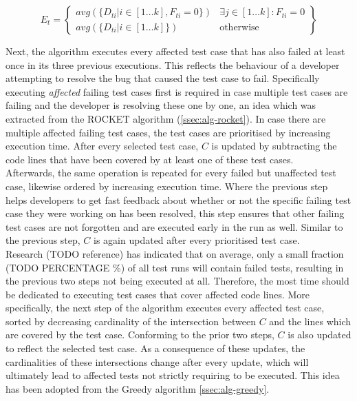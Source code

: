 \[
E_t = \left\{
\begin{array}{rl}
avg(\{D_{ti} \vert i \in [1 \dots k], F_{ti} = 0\}) & \exists j \in [1 \dots k] : F_{ti} = 0 \\
avg(\{D_{ti} \vert i \in [1 \dots k]\}) & \text{otherwise}
\end{array}
\right\}
\]

\noindent Next, the algorithm executes every affected test case that has also failed at least once in its three previous executions. This reflects the behaviour of a developer attempting to resolve the bug that caused the test case to fail. Specifically executing \emph{affected} failing test cases first is required in case multiple test cases are failing and the developer is resolving these one by one, an idea which was extracted from the ROCKET algorithm (\autoref{ssec:alg-rocket}). In case there are multiple affected failing test cases, the test cases are prioritised by increasing execution time. After every selected test case, $C$ is updated by subtracting the code lines that have been covered by at least one of these test cases.\\

\noindent Afterwards, the same operation is repeated for every failed but unaffected test case, likewise ordered by increasing execution time. Where the previous step helps developers to get fast feedback about whether or not the specific failing test case they were working on has been resolved, this step ensures that other failing test cases are not forgotten and are executed early in the run as well. Similar to the previous step, $C$ is again updated after every prioritised test case.\\

\noindent Research (TODO reference) has indicated that on average, only a small fraction (TODO PERCENTAGE \%) of all test runs will contain failed tests, resulting in the previous two steps not being executed at all. Therefore, the most time should be dedicated to executing test cases that cover affected code lines. More specifically, the next step of the algorithm executes every affected test case, sorted by decreasing cardinality of the intersection between $C$ and the lines which are covered by the test case. Conforming to the prior two steps, $C$ is also updated to reflect the selected test case. As a consequence of these updates, the cardinalities of these intersections change after every update, which will ultimately lead to affected tests not strictly requiring to be executed. This idea has been adopted from the Greedy algorithm \autoref{ssec:alg-greedy}.\\

